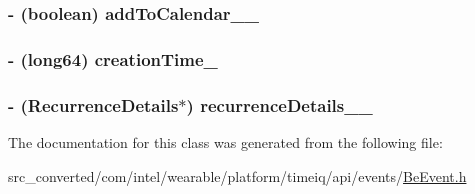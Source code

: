 \subsubsection[{add\+To\+Calendar\+\_\+\+\_\+}]{\setlength{\rightskip}{0pt plus 5cm}-\/ (boolean) add\+To\+Calendar\+\_\+\+\_\+}\label{interface_be_event___be_event_builder_ad3328ec0ebc43e1542abf85f71511826}
\hypertarget{interface_be_event___be_event_builder_adc297c87c707e948202af179f92aa6b8}{}
\subsubsection[{creation\+Time\+\_\+}]{\setlength{\rightskip}{0pt plus 5cm}-\/ (long64) creation\+Time\+\_\+}\label{interface_be_event___be_event_builder_adc297c87c707e948202af179f92aa6b8}
\hypertarget{interface_be_event___be_event_builder_a755c4793d4746d78c5731e2a9628eb1e}{}
\subsubsection[{recurrence\+Details\+\_\+\+\_\+}]{\setlength{\rightskip}{0pt plus 5cm}-\/ ({\bf Recurrence\+Details}$\ast$) recurrence\+Details\+\_\+\+\_\+}\label{interface_be_event___be_event_builder_a755c4793d4746d78c5731e2a9628eb1e}


The documentation for this class was generated from the following file\+:\begin{DoxyCompactItemize}
\item 
src\+\_\+converted/com/intel/wearable/platform/timeiq/api/events/\hyperlink{_be_event_8h}{Be\+Event.\+h}\end{DoxyCompactItemize}
